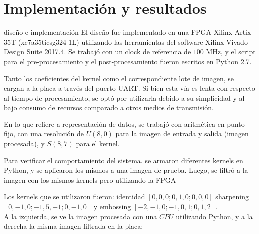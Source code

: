 \documentclass[a4paper]{article}
\begin{document}
\section{Implementación y resultados}  \label{implementations_sec}
 diseño e implementación
El diseño fue implementado en una FPGA Xilinx Artix-35T (xc7a35ticsg324-1L) utilizando las herramientas del software
Xilinx Vivado Design Suite 2017.4. Se trabajó con un clock de referencia de $100$ MHz, y el script para el pre-procesamiento 
y el post-procesamiento fueron escritos en Python 2.7.

Tanto los coeficientes del kernel como el correspondiente lote de imagen, se cargan a la placa a través
del puerto UART. Si bien esta vía es lenta con respecto al tiempo de procesamiento, se optó por utilizarla
debido a su simplicidad y al bajo consumo de recursos comparado a otros medios de transmisión.

En lo que refiere a representación de datos, se trabajó con aritmética en punto fijo, con una
resolución de $U(8,0)$ para la imagen de entrada y salida (imagen procesada), y $S(8,7)$ para el kernel.


Para verificar el comportamiento del sistema. se armaron diferentes kernels
en Python, y se aplicaron los mismos a una imagen de prueba. Luego, 
se filtró a la imagen con los mismos kernels  pero utilizando la FPGA

Los kernels que se utilizaron fueron: identidad $[0, 0, 0; 0, 1, 0; 0, 0,
0]$ sharpening $[0, -1, 0; -1, 5, -1; 0, -1, 0]$ y embossing $[-2, -1, 0; -1,
0, 1; 0, 1, 2]$.\\


A la izquierda, se ve la imagen procesada con una $CPU$ utilizando Python, y a la derecha
la misma imagen filtrada en la placa:
\end{document}
